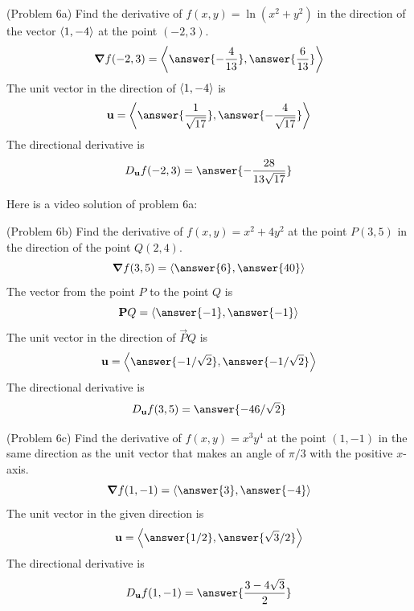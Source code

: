\documentclass[handout]{ximera}
\begin{document}
\begin{problem}(Problem 6a)
Find the derivative of $f(x,y) = \ln(x^2 + y^2)$ in the direction 
of the vector $\left\langle 1, -4\right\rangle$ at the point $(-2, 3)$.\\
\[
\grad f(-2, 3) = \vector{\answer{-\frac{4}{13}}, \answer{\frac{6}{13}}}
\]
The unit vector in the direction of $\left\langle 1, -4\right\rangle$ is
\[
\vec u =  \vector{\answer{\frac{1}{\sqrt{17}}}, \answer{-\frac{4}{\sqrt{17}}}}
\]
The directional derivative is
\[
D_{\vec u} f(-2, 3) = \answer{-\frac{28}{13\sqrt{17}}}
\]
\end{problem}

Here is a video solution of problem 6a:\\
\begin{foldable}
\end{foldable}


\begin{problem}(Problem 6b)
Find the derivative of $f(x,y) = x^2 + 4y^2$ at the point $P(3, 5)$ in the direction 
of the point $Q(2,4)$.\\
\[
\grad f(3, 5) = \vector{\answer{6}, \answer{40}}
\]
The vector from the point $P$ to the point $Q$ is
\[
\vec PQ = \vector{\answer{-1}, \answer{-1}}
\]
The unit vector in the direction of $\vec PQ$ is
\[
\vec u = \vector{\answer{-1/\sqrt 2}, \answer{-1/\sqrt 2}}
\]
The directional derivative is
\[
D_{\vec u} f(3, 5) = \answer{-46/\sqrt 2}
\]

\end{problem}

\begin{problem}(Problem 6c)
Find the derivative of $f(x,y) = x^3 y^4$ at the point $(1,-1)$ in the same direction 
as the 
unit vector that makes an angle of $\pi/3$ with the positive $x$-axis.\\
\[
\grad f(1, -1) = \vector{\answer{3}, \answer{-4}}
\]
The unit vector in the given direction is
\[
\vec u = \vector{\answer{1/2}, \answer{\sqrt{3} /2}}
\]
The directional derivative is
\[
D_{\vec u} f(1, -1) = \answer{\frac{3-4\sqrt 3}{2}}
\]
\end{problem}
\end{document}
